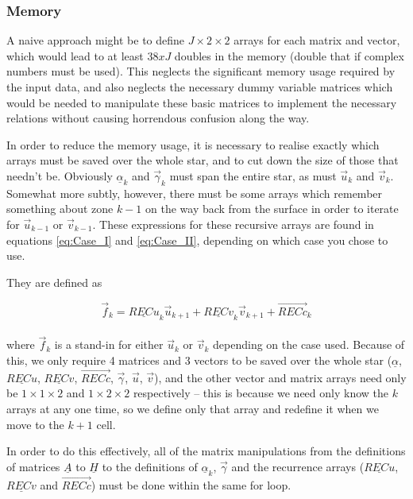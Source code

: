 \documentclass[11pt]{amsart}
\begin{document}
\subsubsection{Memory}

A naive approach might be to define $J \times 2 \times 2$ arrays for each matrix and vector, which would lead to at least $38 x J$ doubles in the memory (double that if complex numbers must be used).  This neglects the significant memory usage required by the input data, and also neglects the necessary dummy variable matrices which would be needed to manipulate these basic matrices to implement the necessary relations without causing horrendous confusion along the way.

In order to reduce the memory usage, it is necessary to realise exactly which arrays must be saved over the whole star, and to cut down the size of those that needn't be.  Obviously $\underline{\alpha}_{k}$ and $\vec{\gamma}_{k}$ must span the entire star, as must $\vec{u}_{k}$ and $\vec{v}_{k}$.  Somewhat more subtly, however, there must be some arrays which remember something about zone $k-1$ on the way back from the surface in order to iterate for $\vec{u}_{k-1}$ or $\vec{v}_{k-1}$.  These expressions for these recursive arrays are found in equations \ref{eq:Case_I} and \ref{eq:Case_II}, depending on which case you chose to use.

They are defined as

\begin{equation} \label{eq:REC_def}
\vec{f}_{k}  =  \underline{RECu}_{k} \vec{u}_{k+1}  +  \underline{RECv}_{k} \vec{v}_{k+1}  +  \vec{RECc}_{k}
\end{equation}
\\
where $\vec{f}_{k}$ is a stand-in for either $\vec{u}_{k}$ or $\vec{v}_{k}$ depending on the case used.  Because of this, we only require 4 matrices and 3 vectors to be saved over the whole star ($\underline{\alpha}$, $\underline{RECu}$, $\underline{RECv}$, $\vec{RECc}$, $\vec{\gamma}$, $\vec{u}$, $\vec{v}$), and the other vector and matrix arrays need only be $1 \times 1 \times 2$ and $1 \times 2 \times 2$ respectively -- this is because we need only know the $k$ arrays at any one time, so we define only that array and redefine it when we move to the $k+1$ cell.

In order to do this effectively, all of the matrix manipulations from the definitions of matrices $\underline{A}$ to $\underline{H}$ to the definitions of $\underline{\alpha}_{k}$, $\vec{\gamma}$ and the recurrence arrays ($\underline{RECu}$, $\underline{RECv}$ and $\vec{RECc}$) must be done within the same for loop.
\end{document}
